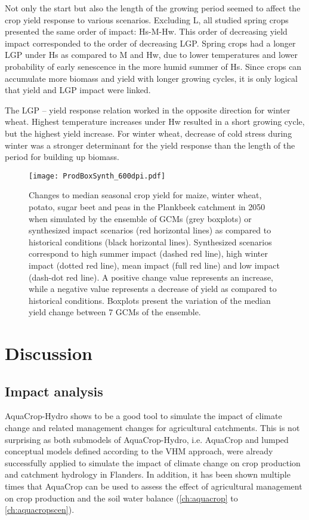 Not only the start but also the length of the growing period seemed to affect the crop yield response to various scenarios. Excluding L, all studied spring crops presented the same order of impact: Hs-M-Hw. This order of decreasing yield impact corresponded to the order of decreasing LGP. Spring crops had a longer LGP under Hs as compared to M and Hw, due to lower temperatures and lower probability of early senescence in the more humid summer of Hs. Since crops can accumulate more biomass and yield with longer growing cycles, it is only logical that yield and LGP impact were linked.  

The LGP – yield response relation worked in the opposite direction for winter wheat. Highest temperature increases under Hw resulted in a short growing cycle, but the highest yield increase. For winter wheat, decrease of cold stress during winter was a stronger determinant for the yield response than the length of the period for building up biomass. 

\begin{figure}[tbhp]
	\centering
		\texttt{[image: ProdBoxSynth\_600dpi.pdf]}
	\caption{Changes to median seasonal crop yield  for maize, winter wheat, potato, sugar beet and peas in the Plankbeek catchment in 2050 when simulated by the ensemble of GCMs (grey boxplots) or synthesized impact scenarios (red horizontal lines) as compared to historical conditions (black horizontal lines). Synthesized scenarios correspond to high summer impact (dashed red line), high winter impact (dotted red line), mean impact (full red line) and low impact (dash-dot red line). A positive change value represents an increase, while a negative value represents a decrease of yield as compared to historical conditions. Boxplots present the variation of the median yield change between 7 GCMs of the ensemble.}
	\label{fig:ch7_ProdBoxSynth}
\end{figure} 
 

\section{Discussion}
\subsection{Impact analysis }
AquaCrop-Hydro shows to be a good tool to simulate the impact of climate change and related management changes for agricultural catchments. This is not surprising as both submodels of AquaCrop-Hydro, i.e. AquaCrop and lumped conceptual models defined according to the VHM approach, were already successfully applied to simulate the impact of climate change on crop production \parencite{vanuytrecht2015, vanuytrecht2014} and catchment hydrology \parencite{vansteenbergen2012, vansteenkiste2012} in Flanders. In addition, it has been shown multiple times that AquaCrop can be used to assess the effect of agricultural management on crop production and the soil water balance (\autoref{ch:aquacrop} to \autoref{ch:aquacropscen}).

